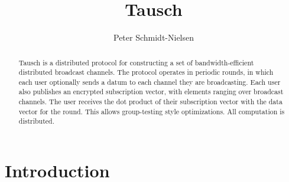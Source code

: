 \documentclass[12pt]{article}
\author{Peter Schmidt-Nielsen}
\title{Tausch}
\begin{document}
\maketitle
\begin{abstract}
Tausch is a distributed protocol for constructing a set of bandwidth-efficient distributed broadcast channels.
The protocol operates in periodic rounds, in which each user optionally sends a datum to each channel they are broadcasting.
Each user also publishes an encrypted subscription vector, with elements ranging over broadcast channels.
The user receives the dot product of their subscription vector with the data vector for the round.
This allows group-testing style optimizations.
All computation is distributed.
\end{abstract}
\section{Introduction}
\end{document}
